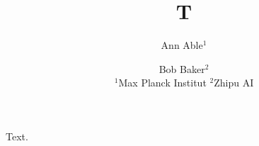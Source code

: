 \documentclass{article}
\begin{document}
\title{T}
\author{Ann Able$^1$ \and Bob Baker$^2$\\
$^1$Max Planck Institut \quad $^2$Zhipu AI}
\maketitle
Text.
\end{document}
